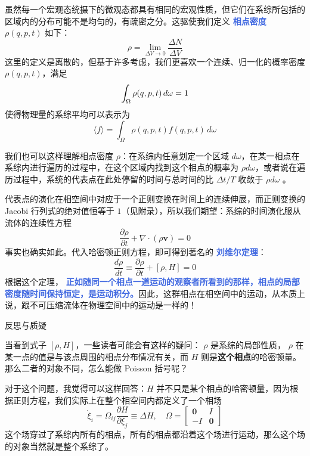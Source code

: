 \documentclass[hyperref,UTF-8]{ctexart}
\newcommand{\0}{\boldsymbol{0}}
\begin{document}
虽然每一个宏观态统摄下的微观态都具有相同的宏观性质，但它们在系综所包括的区域内的分布可能不是均匀的，有疏密之分。这驱使我们定义 \textcolor{RoyalBlue}{\textbf{\kaishu 相点密度}} $\rho(q,p,t)$ 如下：
\begin{equation}
    \rho = \lim_{\Delta V\rightarrow 0} \frac{\Delta N}{\Delta V} 
\end{equation}
这里的定义是离散的，但基于许多考虑，我们更喜欢一个连续、归一化的概率密度 $\rho(q,p,t)$，满足
\begin{equation}
    \int_\Omega \rho(q,p,t)\,d\omega = 1 \\
\end{equation}
使得物理量的系综平均可以表示为
\begin{equation}
    \langle f \rangle =  \int_\Omega \rho(q,p,t)f(q,p,t)\,d\omega
\end{equation}

我们也可以这样理解相点密度 $\rho$：在系综内任意划定一个区域 $d \omega$，在某一相点在系综内进行遍历的过程中，在这个区域内找到这个相点的概率为 $\rho d \omega$，或者说在遍历过程中，系统的代表点在此处停留的时间与总时间的比 $\Delta t / T$  收敛于 $\rho d \omega$ 。

代表点的演化在相空间中对应于一个正则变换在时间上的连续伸展\cite{liang}，而正则变换的Jacobi 行列式的绝对值恒等于 $1$（见附录），所以我们期望：系综的时间演化服从流体的连续性方程
\begin{equation}
    \frac{\partial \rho}{\partial t} + \nabla \cdot (\rho \bm{v}) = 0
\end{equation}
事实也确实如此。代入哈密顿正则方程，即可得到著名的 \textcolor{RoyalBlue}{\textbf{\kaishu 刘维尔定理}}：
\begin{equation}
    \frac{d \rho}{dt} \equiv \frac{\partial \rho}{\partial t} + [\rho ,H] = 0
\end{equation}
根据这个定理， \textcolor{RoyalBlue}{\textbf{\kaishu 正如随同一个相点一道运动的观察者所看到的那样，相点的局部密度随时间保持恒定，是运动积分。}}因此，这群相点在相空间中的运动，从本质上说，跟不可压缩流体在物理空间中的运动是一样的！

\begin{justification}{\kaishu 反思与质疑}
    \kaishu \fontsize{11pt}{16pt}
    
    \quad\quad 当看到式子 $[\rho , H]$，一些读者可能会有这样的疑问： $\rho$ 是系综的局部性质， $\rho$ 在某一点的值是与该点周围的相点分布情况有关，而 $H$ 则是\textbf{这个相点}的哈密顿量。那么二者的对象不同，怎么能做 Poisson 括号呢？
    
    \quad\quad 对于这个问题，我觉得可以这样回答：$H$ 并不只是某个相点的哈密顿量，因为根据正则方程，我们实际上在整个相空间内都定义了一个相场\cite{pan}
    \[
        \dot\xi_i = \Omega_{ij}\frac{\partial H}{\partial \xi_j} \equiv \Delta H,\quad \Omega =
        \begin{bmatrix}
            \bm{0} & I\\
            -I& \bm{0}
        \end{bmatrix}
    \]
    这个场穿过了系综内所有的相点，所有的相点都沿着这个场进行运动，那么这个场的对象当然就是整个系综了。
    \end{justification}
\end{document}
